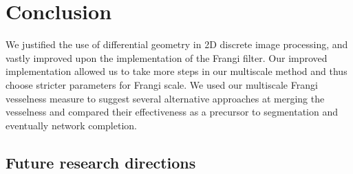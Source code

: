 \chapter{Conclusion} \label{ch:conclusion}

We justified the use of differential geometry in 2D discrete image processing, and vastly improved upon the implementation of the Frangi filter. Our improved implementation allowed us to take more steps in our multiscale method and thus choose stricter parameters for Frangi scale. We used our multiscale Frangi vesselness measure to suggest several alternative approaches at merging the vesselness and compared their effectiveness as a precursor to segmentation and eventually network completion.

\section{Future research directions} \label{sec:future-research-directions}

